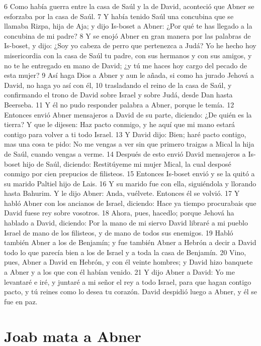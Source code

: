 6 Como había guerra entre la casa de Saúl y la de David, aconteció que Abner se esforzaba por la casa de Saúl.
7 Y había tenido Saúl una concubina que se llamaba Rizpa, hija de Aja; y dijo Is-boset a Abner: ¿Por qué te has llegado a la concubina de mi padre?
8 Y se enojó Abner en gran manera por las palabras de Is-boset, y dijo: ¿Soy yo cabeza de perro que pertenezca a Judá? Yo he hecho hoy misericordia con la casa de Saúl tu padre, con sus hermanos y con sus amigos, y no te he entregado en mano de David; ¿y tú me haces hoy cargo del pecado de esta mujer?
9 Así haga Dios a Abner y aun le añada, si como ha jurado Jehová a David, no haga yo así con él,
10 trasladando el reino de la casa de Saúl, y confirmando el trono de David sobre Israel y sobre Judá, desde Dan hasta Beerseba.
11 Y él no pudo responder palabra a Abner, porque le temía.
12 Entonces envió Abner mensajeros a David de su parte, diciendo: ¿De quién es la tierra? Y que le dijesen: Haz pacto conmigo, y he aquí que mi mano estará contigo para volver a ti todo Israel.
13 Y David dijo: Bien; haré pacto contigo, mas una cosa te pido: No me vengas a ver sin que primero traigas a Mical la hija de Saúl, cuando vengas a verme.
14 Después de esto envió David mensajeros a Is-boset hijo de Saúl, diciendo: Restitúyeme mi mujer Mical, la cual desposé conmigo por cien prepucios de filisteos. 
15 Entonces Is-boset envió y se la quitó a su marido Paltiel hijo de Lais.
16 Y su marido fue con ella, siguiéndola y llorando hasta Bahurim. Y le dijo Abner: Anda, vuélvete. Entonces él se volvió.
17 Y habló Abner con los ancianos de Israel, diciendo: Hace ya tiempo procurabais que David fuese rey sobre vosotros.
18 Ahora, pues, hacedlo; porque Jehová ha hablado a David, diciendo: Por la mano de mi siervo David libraré a mi pueblo Israel de mano de los filisteos, y de mano de todos sus enemigos. 
19 Habló también Abner a los de Benjamín; y fue también Abner a Hebrón a decir a David todo lo que parecía bien a los de Israel y a toda la casa de Benjamín.
20 Vino, pues, Abner a David en Hebrón, y con él veinte hombres; y David hizo banquete a Abner y a los que con él habían venido.
21 Y dijo Abner a David: Yo me levantaré e iré, y juntaré a mi señor el rey a todo Israel, para que hagan contigo pacto, y tú reines como lo desea tu corazón. David despidió luego a Abner, y él se fue en paz.

\section*{Joab mata a Abner}

